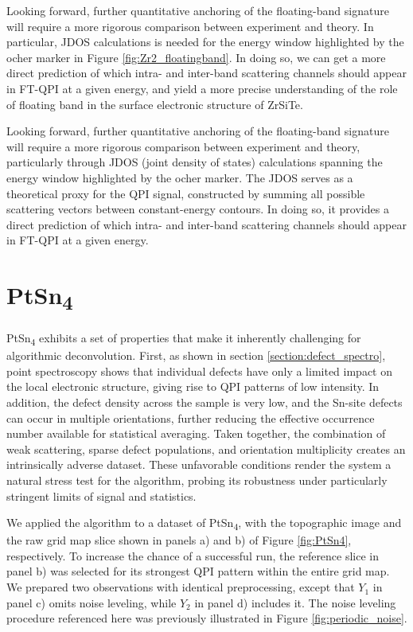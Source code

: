 Looking forward, further quantitative anchoring of the floating-band signature will require a more rigorous comparison between experiment and theory. In particular, \ac{JDOS} calculations is needed for the energy window highlighted by the ocher marker in Figure \ref{fig:Zr2_floatingband}. In doing so, we can get a more direct prediction of which intra- and inter-band scattering channels should appear in FT-QPI at a given energy, and yield a more precise understanding of the role of floating band in the surface electronic structure of ZrSiTe. 

Looking forward, further quantitative anchoring of the floating-band signature will require a more rigorous comparison between experiment and theory, particularly through JDOS (joint density of states) calculations spanning the energy window highlighted by the ocher marker. The JDOS serves as a theoretical proxy for the QPI signal, constructed by summing all possible scattering vectors between constant-energy contours. In doing so, it provides a direct prediction of which intra- and inter-band scattering channels should appear in FT-QPI at a given energy.

\section{PtSn\textsubscript{4}}

PtSn\textsubscript{4} exhibits a set of properties that make it inherently challenging for algorithmic deconvolution. First, as shown in section \ref{section:defect_spectro}, point spectroscopy shows that individual defects have only a limited impact on the local electronic structure, giving rise to \ac{QPI} patterns of low intensity. In addition, the defect density across the sample is very low, and the Sn-site defects can occur in multiple orientations, further reducing the effective occurrence number available for statistical averaging. Taken together, the combination of weak scattering, sparse defect populations, and orientation multiplicity creates an intrinsically adverse dataset. These unfavorable conditions render the system a natural stress test for the algorithm, probing its robustness under particularly stringent limits of signal and statistics.

We applied the algorithm to a dataset of PtSn\textsubscript{4}, with the topographic image and the raw grid map slice shown in panels a) and b) of Figure \ref{fig:PtSn4}, respectively. To increase the chance of a successful run, the reference slice in panel b) was selected for its strongest QPI pattern within the entire grid map. We prepared two observations with identical preprocessing, except that $Y_1$ in panel c) omits noise leveling, while $Y_2$ in panel d) includes it. The noise leveling procedure referenced here was previously illustrated in Figure \ref{fig:periodic_noise}.

